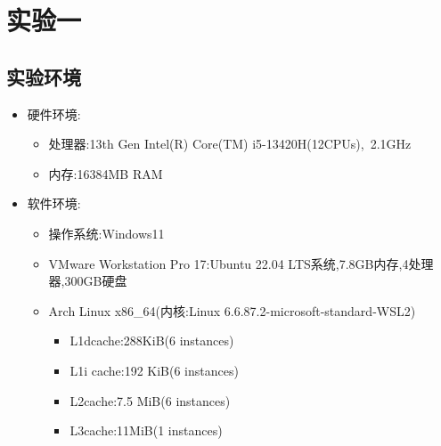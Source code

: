 \section{实验一}
\subsection{实验环境}
\begin{itemize}
 \item 硬件环境:
\begin{itemize}
    \item 处理器:13th Gen Intel(R) Core(TM) i5-13420H(12CPUs),~2.1GHz
    \item 内存:16384MB RAM
 \end{itemize}
 
 \item 软件环境:
 \begin{itemize}
    \item 操作系统:Windows11
    \item VMware Workstation Pro 17:Ubuntu 22.04 LTS系统,7.8GB内存,4处理器,300GB硬盘
    \item Arch Linux x86\_64(内核:Linux 6.6.87.2-microsoft-standard-WSL2)
    \begin{itemize}
      \item L1d\quad cache:288KiB(6 instances)
      \item L1i \quad cache:192 KiB(6 instances)
      \item L2\quad cache:7.5 MiB(6 instances)
      \item L3\quad cache:11MiB(1 instances)
    \end{itemize}
 \end{itemize}
\end{itemize}